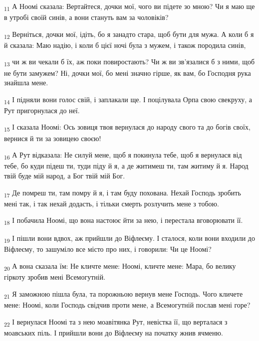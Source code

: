 \begin{tcolorbox}
\textsubscript{11} А Ноомі сказала: Вертайтеся, дочки мої, чого ви підете зо мною? Чи я маю ще в утробі своїй синів, а вони стануть вам за чоловіків?
\end{tcolorbox}
\begin{tcolorbox}
\textsubscript{12} Верніться, дочки мої, ідіть, бо я занадто стара, щоб бути для мужа. А коли б я й сказала: Маю надію, і коли б цієї ночі була з мужем, і також породила синів,
\end{tcolorbox}
\begin{tcolorbox}
\textsubscript{13} чи ж ви чекали б їх, аж поки повиростають? Чи ж ви зв'язалися б з ними, щоб не бути замужем? Ні, дочки мої, бо мені значно гірше, як вам, бо Господня рука знайшла мене.
\end{tcolorbox}
\begin{tcolorbox}
\textsubscript{14} І підняли вони голос свій, і заплакали ще. І поцілувала Орпа свою свекруху, а Рут пригорнулася до неї.
\end{tcolorbox}
\begin{tcolorbox}
\textsubscript{15} І сказала Ноомі: Ось зовиця твоя вернулася до народу свого та до богів своїх, вернися й ти за зовицею своєю!
\end{tcolorbox}
\begin{tcolorbox}
\textsubscript{16} А Рут відказала: Не силуй мене, щоб я покинула тебе, щоб я вернулася від тебе, бо куди підеш ти, туди піду й я, а де житимеш ти, там житиму й я. Народ твій буде мій народ, а Бог твій мій Бог.
\end{tcolorbox}
\begin{tcolorbox}
\textsubscript{17} Де помреш ти, там помру й я, і там буду похована. Нехай Господь зробить мені так, і так нехай додасть, і тільки смерть розлучить мене з тобою.
\end{tcolorbox}
\begin{tcolorbox}
\textsubscript{18} І побачила Ноомі, що вона настоює йти за нею, і перестала вговорювати її.
\end{tcolorbox}
\begin{tcolorbox}
\textsubscript{19} І пішли вони вдвох, аж прийшли до Віфлеєму. І сталося, коли вони входили до Віфлеєму, то зашуміло все місто про них, і говорили: Чи це Ноомі?
\end{tcolorbox}
\begin{tcolorbox}
\textsubscript{20} А вона сказала їм: Не кличте мене: Ноомі, кличте мене: Мара, бо велику гіркоту зробив мені Всемогутній.
\end{tcolorbox}
\begin{tcolorbox}
\textsubscript{21} Я заможною пішла була, та порожньою вернув мене Господь. Чого кличете мене: Ноомі, коли Господь свідчив проти мене, а Всемогутній послав мені горе?
\end{tcolorbox}
\begin{tcolorbox}
\textsubscript{22} І вернулася Ноомі та з нею моавітянка Рут, невістка її, що верталася з моавських піль. І прийшли вони до Віфлеєму на початку жнив ячменю.
\end{tcolorbox}
